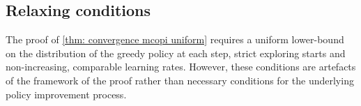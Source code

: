 


\subsection{Relaxing conditions}
\label{sec: relaxing conditions}



The proof of \autoref{thm: convergence mcopi uniform}
requires a uniform lower-bound on the distribution of the greedy policy at each step, strict exploring starts and non-increasing, comparable learning rates.
However, these conditions are artefacts of the framework of the proof rather than necessary conditions for the underlying policy improvement process.


